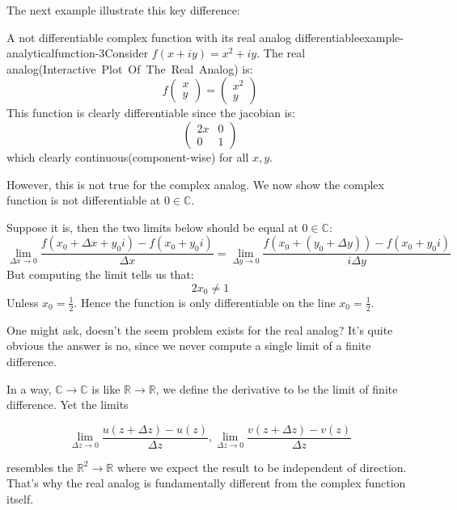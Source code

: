 The next example illustrate this key difference:

\begin{mystthmexample}{A not differentiable complex function with its real analog differentiable}{example-analyticalfunction-3}Consider $f(x+iy)=x^2 + iy$. The real analog(Interactive~Plot~Of~The~Real~Analog) is:
\begin{equation}
f\begin{pmatrix}
x \\
y
\end{pmatrix}= 
\begin{pmatrix}
x^2 \\
y
\end{pmatrix}
\end{equation}
This function is clearly differentiable since the jacobian is:
\begin{equation}
\begin{pmatrix}
2x & 0 \\
0 & 1
\end{pmatrix}
\end{equation}
which clearly continuous(component-wise) for all $x,y$.

However, this is not true for the complex analog. We now show the complex function is not differentiable at $0\in \mathbb{C}$.

Suppose it is, then the two limits below should be equal at $0\in \mathbb{C}$:
\begin{equation}
\label{complex_derivative_limit}
\lim_{\Delta x\to 0}\frac{f(x_0 + \Delta x + y_0i) -f(x_0 + y_0 i)}{\Delta x} = \lim_{\Delta y\to 0}\frac{f(x_0 + (y_0 +\Delta y)) -f(x_0 + y_0 i)}{i\Delta y }
\end{equation}
But computing the limit tells us that:
\begin{equation}
2x_0 \neq 1
\end{equation}
Unless $x_0 = \frac{1}{2}$. Hence the function is only differentiable on the line $x_0=\frac12$.

One might ask, doesn't the seem problem exists for the real analog? It's quite obvious the answer is no, since we never compute a single limit of a finite difference.

In a way, $\mathbb{C} \to \mathbb{C}$ is like $\mathbb{R}\to \mathbb{R}$, we define the derivative to be the limit of finite difference. Yet the limits

\begin{equation}
\lim_{\Delta z\to 0}\frac{u(z+\Delta z) -u(z)}{\Delta z}, \lim_{\Delta z\to 0}\frac{v(z+\Delta z) -v(z)}{\Delta z}
\end{equation}

resembles the $\mathbb{R}^2 \to \mathbb{R}$ where we expect the result to be independent of direction. That's why the real analog is fundamentally different from the complex function itself.

\end{mystthmexample}

